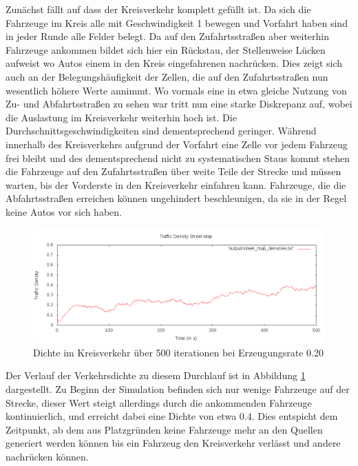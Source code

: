 \documentclass[10pt, a4paper]{article}
\begin{document}
Zunächst fällt auf dass der Kreisverkehr komplett gefüllt ist. Da sich die Fahrzeuge im Kreis alle mit Geschwindigkeit 1 bewegen und Vorfahrt haben sind in jeder Runde alle Felder belegt. Da auf den Zufahrtsstraßen aber weiterhin Fahrzeuge ankommen bildet sich hier ein Rückstau, der Stellenweise Lücken aufweist wo Autos einem in den Kreis eingefahrenen nachrücken. Dies zeigt sich auch an der Belegungshäufigkeit der Zellen, die auf den Zufahrtsstraßen nun wesentlich höhere Werte annimmt. Wo vormals eine in etwa gleiche Nutzung von Zu- und Abfahrtsstraßen zu sehen war tritt nun eine starke Diskrepanz auf, wobei die Auslastung im Kreisverkehr weiterhin hoch ist. Die Durchschnittsgeschwindigkeiten sind dementsprechend geringer. Während innerhalb des Kreisverkehrs aufgrund der Vorfahrt eine Zelle vor jedem Fahrzeug frei bleibt und des dementsprechend nicht zu systematischen Staus kommt stehen die Fahrzeuge auf den Zufahrtsstraßen über weite Teile der Strecke und müssen warten, bis der Vorderste in den Kreisverkehr einfahren kann. Fahrzeuge, die die Abfahrtsstraßen erreichen können ungehindert beschleunigen, da sie in der Regel keine Autos vor sich haben.

\begin{figure}[h!]
	\centering
	\includegraphics[width=\textwidth]{img/roundabout_020_densities}
	\caption{Dichte im Kreisverkehr über 500 iterationen bei Erzeugungsrate 0.20}
	\label{fig:roundabout020density}
\end{figure}

Der Verlauf der Verkehrsdichte zu diesem Durchlauf ist in Abbildung \ref{fig:roundabout020density} dargestellt. Zu Beginn der Simulation befinden sich nur wenige Fahrzeuge auf der Strecke, dieser Wert steigt allerdings durch die ankommenden Fahrzeuge kontinuierlich, und erreicht dabei eine Dichte von etwa $0.4$. Dies entspicht dem Zeitpunkt, ab dem aus Platzgründen keine Fahrzeuge mehr an den Quellen generiert werden können bis ein Fahrzeug den Kreisverkehr verlässt und andere nachrücken können.
\end{document}
